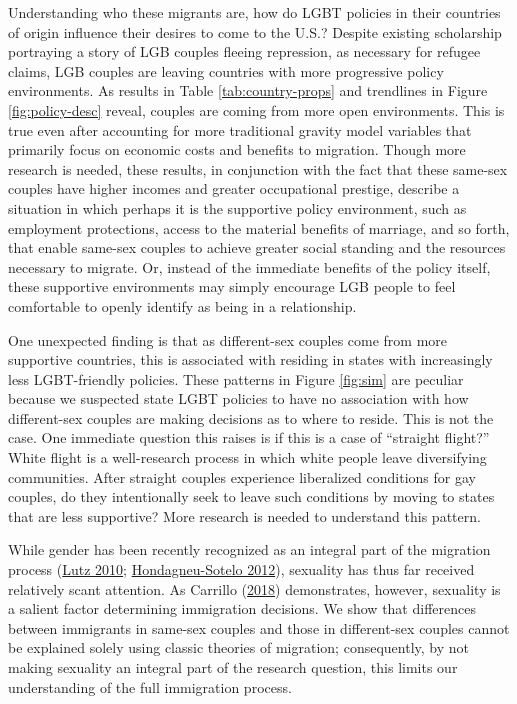 \documentclass[
  11pt,
]{article}
\begin{document}
Understanding who these migrants are, how do LGBT policies in their countries of origin influence their desires to come to the U.S.? Despite existing scholarship portraying a story of LGB couples fleeing repression, as necessary for refugee claims, LGB couples are leaving countries with more progressive policy environments. As results in Table \ref{tab:country-props} and trendlines in Figure \ref{fig:policy-desc} reveal, couples are coming from more open environments. This is true even after accounting for more traditional gravity model variables that primarily focus on economic costs and benefits to migration. Though more research is needed, these results, in conjunction with the fact that these same-sex couples have higher incomes and greater occupational prestige, describe a situation in which perhaps it is the supportive policy environment, such as employment protections, access to the material benefits of marriage, and so forth, that enable same-sex couples to achieve greater social standing and the resources necessary to migrate. Or, instead of the immediate benefits of the policy itself, these supportive environments may simply encourage LGB people to feel comfortable to openly identify as being in a relationship.

One unexpected finding is that as different-sex couples come from more supportive countries, this is associated with residing in states with increasingly less LGBT-friendly policies. These patterns in Figure \ref{fig:sim} are peculiar because we suspected state LGBT policies to have no association with how different-sex couples are making decisions as to where to reside. This is not the case. One immediate question this raises is if this is a case of ``straight flight?'' White flight is a well-research process in which white people leave diversifying communities. After straight couples experience liberalized conditions for gay couples, do they intentionally seek to leave such conditions by moving to states that are less supportive? More research is needed to understand this pattern.

While gender has been recently recognized as an integral part of the migration process (\protect\hyperlink{ref-lutz_2010}{Lutz 2010}; \protect\hyperlink{ref-hondagneu-sotelo_2012}{Hondagneu-Sotelo 2012}), sexuality has thus far received relatively scant attention. As Carrillo (\protect\hyperlink{ref-carrillo_2018}{2018}) demonstrates, however, sexuality is a salient factor determining immigration decisions. We show that differences between immigrants in same-sex couples and those in different-sex couples cannot be explained solely using classic theories of migration; consequently, by not making sexuality an integral part of the research question, this limits our understanding of the full immigration process.
\end{document}
